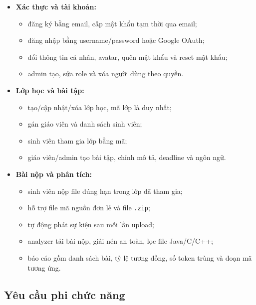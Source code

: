 \documentclass[12pt,a4paper]{article}
\begin{document}
\begin{itemize}
    \item \textbf{Xác thực và tài khoản:}
    \begin{itemize}
        \item đăng ký bằng email, cấp mật khẩu tạm thời qua email;
        \item đăng nhập bằng username/password hoặc Google OAuth;
        \item đổi thông tin cá nhân, avatar, quên mật khẩu và reset mật khẩu;
        \item admin tạo, sửa role và xóa người dùng theo quyền.
    \end{itemize}
    \item \textbf{Lớp học và bài tập:}
    \begin{itemize}
        \item tạo/cập nhật/xóa lớp học, mã lớp là duy nhất;
        \item gán giáo viên và danh sách sinh viên;
        \item sinh viên tham gia lớp bằng mã;
        \item giáo viên/admin tạo bài tập, chỉnh mô tả, deadline và ngôn ngữ.
    \end{itemize}
    \item \textbf{Bài nộp và phân tích:}
    \begin{itemize}
        \item sinh viên nộp file đúng hạn trong lớp đã tham gia;
        \item hỗ trợ file mã nguồn đơn lẻ và file \texttt{.zip};
        \item tự động phát sự kiện sau mỗi lần upload;
        \item analyzer tải bài nộp, giải nén an toàn, lọc file Java/C/C++;
        \item báo cáo gồm danh sách bài, tỷ lệ tương đồng, số token trùng và đoạn mã tương ứng.
    \end{itemize}
\end{itemize}

\subsection{Yêu cầu phi chức năng}
\end{document}
